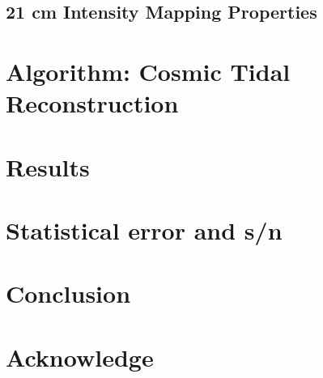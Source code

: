 \documentclass[aps,prd,twocolumn,showpacs,superscriptaddress,groupedaddress,nofootinbib]{revtex4}  %
\begin{document}
\subsection{21 cm Intensity Mapping Properties} 

%
%
\section{Algorithm: Cosmic Tidal Reconstruction}

\section{Results}

%
%
\section{Statistical error and s/n}

\section{Conclusion}

\section{Acknowledge}

%


\end{document}
